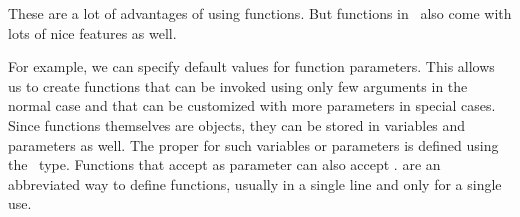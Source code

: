 These are a lot of advantages of using functions.
But functions in \python\ also come with lots of nice features as well.

For example, we can specify default values for function parameters.
This allows us to create functions that can be invoked using only few arguments in the normal case and that can be customized with more parameters in special cases.
Since functions themselves are objects, they can be stored in variables and parameters as well.
The proper  for such variables or parameters is defined using the~ type.
Functions that accept  as parameter can also accept .
 are an abbreviated way to define functions, usually in a single line and only for a single use.%
\endhsection%
%
\endhsection%
%
